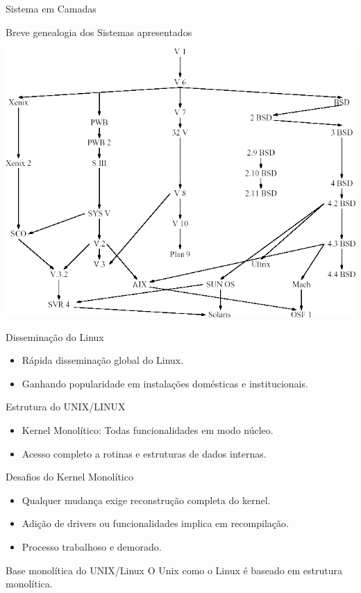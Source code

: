 \documentclass{beamer}
\begin{document}
\begin{frame}{Sistema em Camadas}
\begin{frame}{Breve genealogia dos Sistemas apresentados}
    \begin{center}
        \includegraphics[width=0.55\linewidth]{assets/aula-tads-sope/SO-unix-linux-1.png}
    \end{center}
\end{frame}



\begin{frame}{Disseminação do Linux}
    \begin{itemize}
        \item Rápida disseminação global do Linux.
        \item Ganhando popularidade em instalações domésticas e institucionais.
    \end{itemize}
\end{frame}
\begin{frame}{Estrutura do UNIX/LINUX}
    \begin{itemize}
        \item Kernel Monolítico: Todas funcionalidades em modo núcleo.
        \item Acesso completo a rotinas e estruturas de dados internas.
    \end{itemize}
\end{frame}

\begin{frame}{Desafios do Kernel Monolítico}
    \begin{itemize}
        \item Qualquer mudança exige reconstrução completa do kernel.
        \item Adição de drivers ou funcionalidades implica em recompilação.
        \item Processo trabalhoso e demorado.
    \end{itemize}
\end{frame}
\begin{frame}{Base monolítica do UNIX/Linux}
    O Unix como o Linux é baseado em estrutura monolítica.
    

\end{frame}
\end{frame}
\end{document}

